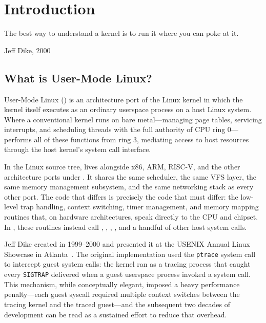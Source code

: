 \chapter{Introduction}
\label{ch:introduction}

\epigraph{%
  The best way to understand a kernel is to run it where you can poke at it.%
}{Jeff Dike, 2000}

\section{What is User-Mode Linux?}
\label{sec:intro-what-is-uml}

User-Mode Linux (\UML{}) is an architecture port of the Linux kernel in which
the kernel itself executes as an ordinary userspace process on a host Linux
system.  Where a conventional kernel runs on bare metal---managing page tables,
servicing interrupts, and scheduling threads with the full authority of CPU ring
0---\UML{} performs all of these functions from ring 3, mediating access to host
resources through the host kernel's system call interface.

In the Linux source tree, \UML{} lives alongside x86, ARM, RISC-V, and the
other architecture ports under .  It shares the same
scheduler, the same VFS layer, the same memory management subsystem, and the
same networking stack as every other port.  The code that differs is precisely
the code that must differ: the low-level trap handling, context switching,
timer management, and memory mapping routines that, on hardware architectures,
speak directly to the CPU and chipset.  In \UML{}, these routines instead call
, , , , and a
handful of other host system calls.

Jeff Dike created \UML{} in 1999--2000 and presented it at the USENIX Annual
Linux Showcase in Atlanta~\cite{dike2000}.  The original implementation used
the \texttt{ptrace} system call to intercept guest system calls: the \UML{}
kernel ran as a tracing process that caught every \texttt{SIGTRAP} delivered
when a guest userspace process invoked a system call.  This mechanism, while
conceptually elegant, imposed a heavy performance penalty---each guest syscall
required multiple context switches between the tracing kernel and the traced
guest---and the subsequent two decades of \UML{} development can be read as a
sustained effort to reduce that overhead.

